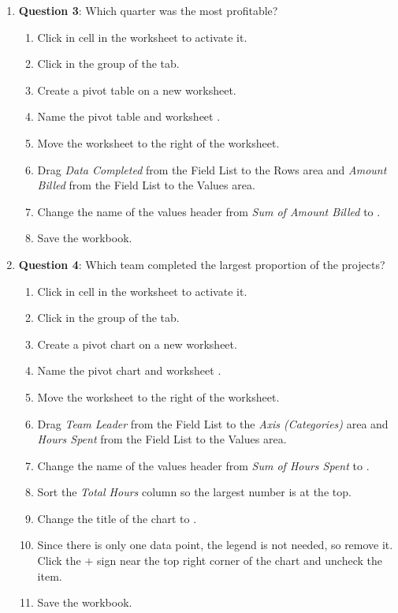 \begin{enumerate}
	\item{\textbf{Question 3}: Which quarter was the most profitable?}

	\begin{enumerate}
		\item Click in cell  in the  worksheet to activate it.
		\item Click  in the  group of the  tab.
		\item Create a pivot table on a new worksheet.
		\item Name the pivot table and worksheet .
		\item Move the  worksheet to the right of the  worksheet.
		\item Drag \textit{Data Completed} from the Field List to the Rows area and \textit{Amount Billed} from the Field List to the Values area.
		\item Change the name of the values header from \textit{Sum of Amount Billed} to .
		\item Save the workbook.
	\end{enumerate}
	
	\item{\textbf{Question 4}: Which team completed the largest proportion of the projects?}

	\begin{enumerate}
		\item Click in cell  in the  worksheet to activate it.
		\item Click  in the  group of the  tab.
		\item Create a pivot chart on a new worksheet.
		\item Name the pivot chart and worksheet .
		\item Move the  worksheet to the right of the  worksheet.
		\item Drag \textit{Team Leader} from the Field List to the \textit{Axis (Categories)} area and \textit{Hours Spent} from the Field List to the Values area.
		\item Change the name of the values header from \textit{Sum of Hours Spent} to .
		\item Sort the \textit{Total Hours} column so the largest number is at the top.
		\item Change the title of the chart to .
		\item Since there is only one data point, the legend is not needed, so remove it. Click the $ + $ sign near the top right corner of the chart and uncheck the  item.
		\item Save the workbook.
	\end{enumerate}


\end{enumerate}
